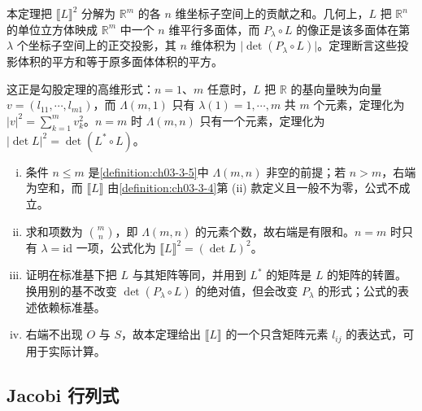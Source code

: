 \documentclass[../../main.tex]{subfiles}%
\begin{document}
\begin{remark}\label{remark:ch03-thm-3-7-动机}
本定理把 $\llbracket L\rrbracket^2$ 分解为 $\mathbb{R}^m$ 的各 $n$ 维坐标子空间上的贡献之和。几何上，$L$ 把 $\mathbb{R}^n$ 的单位立方体映成 $\mathbb{R}^m$ 中一个 $n$ 维平行多面体，而 $P_\lambda\circ L$ 的像正是该多面体在第 $\lambda$ 个坐标子空间上的正交投影，其 $n$ 维体积为 $\lvert\det(P_\lambda\circ L)\rvert$。定理断言这些投影体积的平方和等于原多面体体积的平方。

这正是勾股定理的高维形式：$n=1$、$m$ 任意时，$L$ 把 $\mathbb{R}$ 的基向量映为向量 $v=(l_{11},\cdots,l_{m1})$，而 $\Lambda(m,1)$ 只有 $\lambda(1)=1,\cdots,m$ 共 $m$ 个元素，定理化为 $\lvert v\rvert^2=\sum_{k=1}^mv_k^2$。$n=m$ 时 $\Lambda(m,n)$ 只有一个元素，定理化为 $\lvert\det L\rvert^2=\det(L^*\circ L)$。
\end{remark}

\begin{remark}\label{remark:ch03-thm-3-7-条件}
\begin{enumerate}[(i)]
\item 条件 $n\leqslant m$ 是\cref{definition:ch03-3-5}中 $\Lambda(m,n)$ 非空的前提；若 $n>m$，右端为空和，而 $\llbracket L\rrbracket$ 由\cref{definition:ch03-3-4}第 (ii) 款定义且一般不为零，公式不成立。%
\item 求和项数为 $\binom{m}{n}$，即 $\Lambda(m,n)$ 的元素个数，故右端是有限和。$n=m$ 时只有 $\lambda=\mathrm{id}$ 一项，公式化为 $\llbracket L\rrbracket^2=(\det L)^2$。
\item 证明在标准基下把 $L$ 与其矩阵等同，并用到 $L^*$ 的矩阵是 $L$ 的矩阵的转置。换用别的基不改变 $\det(P_\lambda\circ L)$ 的绝对值，但会改变 $P_\lambda$ 的形式；公式的表述依赖标准基。
\item 右端不出现 $O$ 与 $S$，故本定理给出 $\llbracket L\rrbracket$ 的一个只含矩阵元素 $l_{ij}$ 的表达式，可用于实际计算。
\end{enumerate}
\end{remark}

\subsection{Jacobi 行列式}\label{subsection:ch03-02-2}
\end{document}
